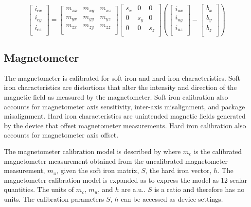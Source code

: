 \begin{equation}
\label{eq:inertialExpanded}
    \begin{bmatrix}
        i_{cx}\\
        i_{cy}\\
        i_{cz}\\
    \end{bmatrix}
    =
    \begin{bmatrix}
        m_{xx} & m_{xy} & m_{xz}\\
        m_{yx} & m_{yy} & m_{yz}\\
        m_{zx} & m_{zy} & m_{zz}\\
    \end{bmatrix}
    \begin{bmatrix}
        s_{x} & 0 & 0\\
        0 & s_{y} & 0\\
        0 & 0 & s_{z}\\
    \end{bmatrix}
    \left(
    \begin{bmatrix}
        i_{ux}\\
        i_{uy}\\
        i_{uz}\\
    \end{bmatrix}
    -
    \begin{bmatrix}
        b_{x}\\
        b_{y}\\
        b_{z}\\
    \end{bmatrix}
    \right)
\end{equation}

\subsection{Magnetometer}
\label{sec:magnetometer}

The magnetometer is calibrated for soft iron and hard-iron characteristics.  Soft iron characteristics are distortions that alter the intensity and direction of the magnetic field as measured by the magnetometer.  Soft iron calibration also accounts for magnetometer axis sensitivity, inter-axis misalignment, and package misalignment.  Hard iron characteristics are unintended magnetic fields generated by the device that offset magnetometer measurements.  Hard iron calibration also accounts for magnetometer axis offset.

The magnetometer calibration model is described by  where $m_c$ is the calibrated magnetometer measurement obtained from the uncalibrated magnetometer measurement, $m_u$, given the soft iron matrix, $S$, the hard iron vector, $h$.  The magnetometer calibration model is expanded as  to express the model as 12 scalar quantities.  The units of $m_c$, $m_u$, and $h$ are \ac{a.u.}.  $S$ is a ratio and therefore has no units.  The calibration parameters $S$, $h$ can be accessed as device settings.

